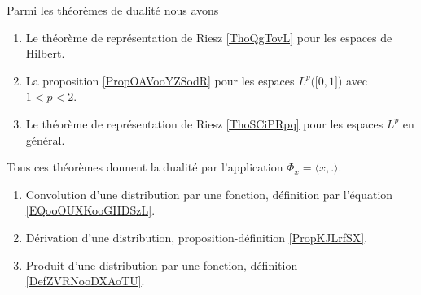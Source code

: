 Parmi les théorèmes de dualité nous avons
\begin{enumerate}
    \item
        Le théorème de représentation de Riesz \ref{ThoQgTovL} pour les espaces de Hilbert.
    \item
        La proposition \ref{PropOAVooYZSodR} pour les espaces \( L^p\big( \mathopen[ 0 , 1 \mathclose] \big)\) avec \( 1<p<2\).
    \item
        Le théorème de représentation de Riesz \ref{ThoSCiPRpq} pour les espaces \( L^p\) en général.
\end{enumerate}
Tous ces théorèmes donnent la dualité par l'application \( \Phi_x=\langle x, .\rangle \).

\begin{enumerate}
    \item
        Convolution d'une distribution par une fonction, définition par l'équation \eqref{EQooOUXKooGHDSzL}.
    \item
        Dérivation d'une distribution, proposition-définition \ref{PropKJLrfSX}.
    \item
        Produit d'une distribution par une fonction, définition \ref{DefZVRNooDXAoTU}.
\end{enumerate}

